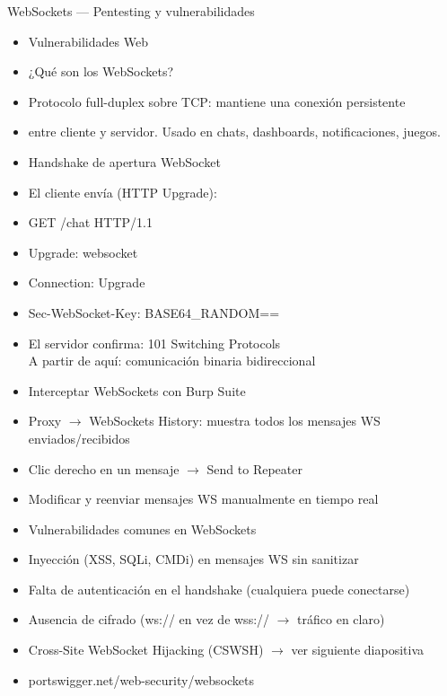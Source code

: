 \documentclass[aspectratio=169,10pt]{beamer}
\newcommand{\cmdbox}[1]{%
  \begin{center}%
  {\setlength{\fboxsep}{6pt}\colorbox{uzlav!40}{\parbox{0.88\linewidth}{\ttfamily\footnotesize #1}}}%
  \end{center}}
\begin{document}
\begin{frame}[allowframebreaks]{WebSockets --- Pentesting y vulnerabilidades}
\small
  \begin{itemize}
  \item Vulnerabilidades Web
  \item ¿Qué son los WebSockets?
  \item Protocolo full-duplex sobre TCP: mantiene una conexión persistente
  \item entre cliente y servidor. Usado en chats, dashboards, notificaciones, juegos.
  \item Handshake de apertura WebSocket
  \item[] \cmdbox{El cliente envía (HTTP Upgrade):}
  \item GET /chat HTTP/1.1
  \item Upgrade: websocket
  \item Connection: Upgrade
  \item Sec-WebSocket-Key: BASE64\_RANDOM==
  \item[] \cmdbox{El servidor confirma: 101 Switching Protocols\\{}
A partir de aquí: comunicación binaria bidireccional}
  \item Interceptar WebSockets con Burp Suite
  \item Proxy $\rightarrow$ WebSockets History: muestra todos los mensajes WS enviados/recibidos
  \item Clic derecho en un mensaje $\rightarrow$ Send to Repeater
  \item Modificar y reenviar mensajes WS manualmente en tiempo real
  \item Vulnerabilidades comunes en WebSockets
  \item Inyección (XSS, SQLi, CMDi) en mensajes WS sin sanitizar
  \item Falta de autenticación en el handshake (cualquiera puede conectarse)
  \item Ausencia de cifrado (ws:// en vez de wss:// $\rightarrow$ tráfico en claro)
  \item Cross-Site WebSocket Hijacking (CSWSH) $\rightarrow$ ver siguiente diapositiva
  \item portswigger.net/web-security/websockets
  \end{itemize}
\end{frame}
\end{document}
